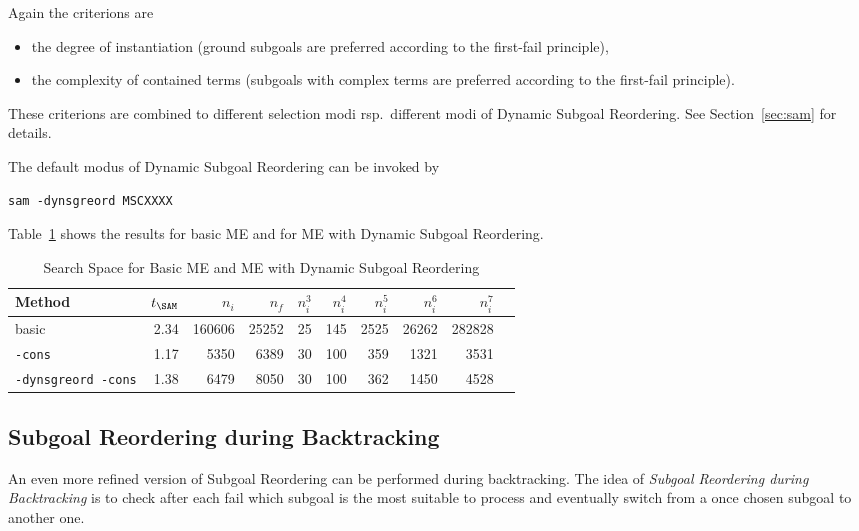 Again the criterions are 
\begin{itemize}
\item the degree of instantiation (ground subgoals are preferred
	according to the first-fail principle),
\item the complexity of contained terms (subgoals with complex
      terms are preferred according to the first-fail principle).  
\end{itemize}
These criterions are combined to different selection modi rsp.\
different modi of Dynamic Subgoal Reordering. See
Section~\ref{sec:sam} for details. 

The default modus of Dynamic Subgoal Reordering can be invoked by
\begin{center}
\begin{verbatim}
sam -dynsgreord MSCXXXX
\end{verbatim}
\end{center}

Table~\ref{tab:tut2:results.dynsgreord} shows the results for basic
ME and for ME with Dynamic Subgoal Reordering.

\begin{table}[htb]
\begin{center}
\begin{tabular}{|l|r|r|r||r|r|r|r|r|r|}
\hline
Method & $t_{\SAM}$ & $n_i$ & $n_f$ & 
	$n_i^3$ & $n_i^4$ & $n_i^5$ & $n_i^6$ & $n_i^7$ \\
\hline\hline
basic & 2.34 & 160606 & 25252 &
	25 & 145 & 2525 & 26262 & 282828 \\
\hline
{\tt -cons} & 1.17 & 5350 & 6389 &
	30 & 100 & 359 & 1321 & 3531 \\
\hline
{\tt -dynsgreord -cons} & 1.38 & 6479 & 8050 &
	30 & 100 & 362 & 1450 & 4528 \\
\hline\hline
\end{tabular}
\end{center}
\caption{Search Space for Basic ME and ME with Dynamic Subgoal Reordering} 
\label{tab:tut2:results.dynsgreord}
\end{table}


\subsection{Subgoal Reordering during Backtracking}

An even more refined version of Subgoal Reordering can be performed
during backtracking. The idea of {\em Subgoal Reordering during
Backtracking\/} is to check after each fail which subgoal is the most
suitable to process and eventually switch from a once chosen subgoal
to another one.

